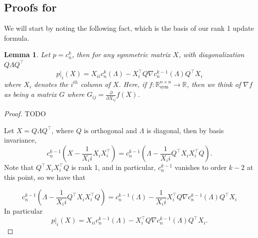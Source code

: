 \documentclass{amsart}
\newtheorem{lemma}[theorem]{Lemma}
\theoremstyle{definition}
\newcommand{\R}{\mathbb{R}}
\newcommand*{\Sym}{\R^{n \times n}_{\mathrm{sym}}}
\begin{document}
\subsection{Proofs for }
We will start by noting the following fact, which is the basis of our rank 1 update formula.
\begin{lemma}
    \label{lem:rank_one}
    Let $p = c^k_n$, then for any symmetric matrix $X$, with diagonalization $Q\Lambda Q^{\intercal}$
    \[
        p|_{i}(X) = X_{ii} c^{k}_n(\Lambda) - X_i^{\intercal}Q\nabla c^{k-1}_n(\Lambda)Q^{\intercal}X_i
    \]
    where $X_i$ denotes the $i^{th}$ column of $X$.
    Here, if $f : \Sym \rightarrow \R$, then we think of $\nabla f$ as being a matrix $G$ where $G_{ij} = \frac{\partial}{\partial X_{ij}}f(X)$.
\end{lemma}
\begin{proof}
    TODO

    Let $X = Q\Lambda Q^{\intercal}$, where $Q$ is orthogonal and $\Lambda$ is diagonal, then by basis invariance,
    \[
        c^{k-1}_n(X - \frac{1}{X_ii}X_iX_i^{\intercal})= 
        c^{k-1}_n(\Lambda - \frac{1}{X_ii}Q^{\intercal}X_iX_i^{\intercal}Q).
    \]
    Note that $Q^{\intercal}X_iX_i^{\intercal}Q$ is rank 1, and in particular, $c^{k-1}_n$ vanishes to order $k-2$ at this point, so we have that

    \[
        c^{k-1}_n(\Lambda - \frac{1}{X_ii}Q^{\intercal}X_iX_i^{\intercal}Q) = 
        c^{k-1}_n(\Lambda) - \frac{1}{X_ii}X_i^{\intercal}Q\nabla c^{k-1}_n(\Lambda)Q^{\intercal}X_i
    \]
    In particular 
    \[
        p|_i(X) = X_{ii}c^{k-1}_n(\Lambda) - X_i^{\intercal}Q\nabla c^{k-1}_n(\Lambda)Q^{\intercal}X_i.
    \]
\end{proof}
\end{document}
